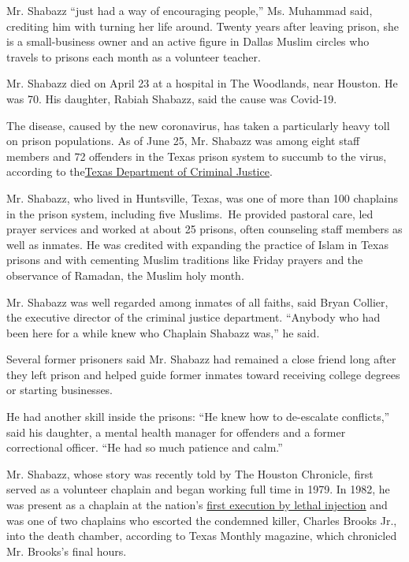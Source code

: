 Mr. Shabazz ``just had a way of encouraging people,'' Ms. Muhammad said,
crediting him with turning her life around. Twenty years after leaving
prison, she is a small-business owner and an active figure in Dallas
Muslim circles who travels to prisons each month as a volunteer teacher.

Mr. Shabazz died on April 23 at a hospital in The Woodlands, near
Houston. He was 70. His daughter, Rabiah Shabazz, said the cause was
Covid-19.

The disease, caused by the new coronavirus, has taken a particularly
heavy toll on prison populations. As of June 25, Mr. Shabazz was among
eight staff members and 72 offenders in the Texas prison system to
succumb to the virus, according to
the\href{https://www.tdcj.texas.gov/}{Texas Department of Criminal
Justice}.

Mr. Shabazz, who lived in Huntsville, Texas, was one of more than 100
chaplains in the prison system, including five Muslims.~He provided
pastoral care, led prayer services and worked at about 25 prisons, often
counseling staff members as well as inmates. He was credited with
expanding the practice of Islam in Texas prisons and with cementing
Muslim traditions like Friday prayers and the observance of Ramadan, the
Muslim holy month.

Mr. Shabazz was well regarded among inmates of all faiths, said Bryan
Collier, the executive director of the criminal justice department.
``Anybody who had been here for a while knew who Chaplain Shabazz was,''
he said.

Several former prisoners said Mr. Shabazz had remained a close friend
long after they left prison and helped guide former inmates toward
receiving college degrees or starting businesses.

He had another skill inside the prisons: ``He knew how to de-escalate
conflicts,'' said his daughter, a mental health manager for offenders
and a former correctional officer. ``He had so much patience and calm.''

Mr. Shabazz, whose story was recently told by The Houston Chronicle,
first served as a volunteer chaplain and began working full time in
1979. In 1982, he was present as a chaplain at the nation's
\href{https://www.nytimes3xbfgragh.onion/1982/12/07/us/technician-executes-murderer-in-texas-by-lethal-injection.html}{first
execution by lethal injection} and was one of two chaplains who escorted
the condemned killer, Charles Brooks Jr., into the death chamber,
according to Texas Monthly magazine, which chronicled Mr. Brooks's final
hours.

